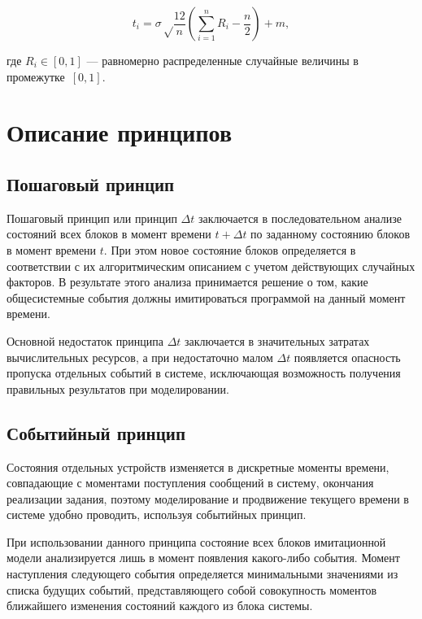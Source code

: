 \begin{equation}
    t_i = \sigma \sqrt\frac{12}{n}(\sum\limits_{i=1}^{n} R_i - \frac{n}{2}) + m,
\end{equation}

где $R_i \in [0, 1]$ --- равномерно распределенные случайные величины в
промежутке~$[0, 1]$.

\section{Описание принципов}

\subsection{Пошаговый принцип}

Пошаговый принцип или принцип $\Delta t$ заключается в последовательном анализе
состояний всех блоков в момент времени $t + \Delta t$ по заданному состоянию
блоков в момент времени $t$. При этом новое состояние блоков определяется в
соответствии с их алгоритмическим описанием с учетом действующих случайных
факторов. В результате этого анализа принимается решение о том, какие
общесистемные события должны имитироваться программой на данный момент времени.

Основной недостаток принципа $\Delta t$ заключается в значительных затратах
вычислительных ресурсов, а при недостаточно малом $\Delta t$ появляется
опасность пропуска отдельных событий в системе, исключающая возможность
получения правильных результатов при моделировании.

\subsection{Событийный принцип}

Состояния отдельных устройств изменяется в дискретные моменты времени,
совпадающие с моментами поступления сообщений в систему, окончания реализации
задания, поэтому моделирование и продвижение текущего времени в системе удобно
проводить, используя событийных принцип.

При использовании данного принципа состояние всех блоков имитационной модели
анализируется лишь в момент появления какого-либо события. Момент наступления
следующего события определяется минимальными значениями из списка будущих
событий, представляющего собой совокупность моментов ближайшего изменения
состояний каждого из блока системы.
